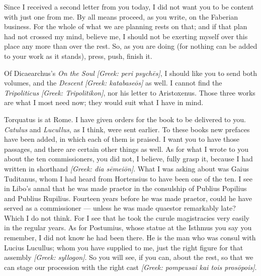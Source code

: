 

 Since I received a second letter from you today, I did not want you to be content with just one from me. By all means proceed, as you write, on the Faberian business. For the whole of what we are planning rests on that; and if that plan had not crossed my mind, believe me, I should not be exerting myself over this place any more than over the rest. So, as you are doing (for nothing can be added to your work as it stands), press, push, finish it.

 Of Dicaearchus's \textit{On the Soul} \textit{[Greek: peri psychēs]}, I should like you to send both volumes, and the \textit{Descent} \textit{[Greek: katabaseōs]} as well. I cannot find the \textit{Tripoliticus} \textit{[Greek: Tripolitikon]}, nor his letter to Aristoxenus. Those three works are what I most need now; they would suit what I have in mind.

 Torquatus is at Rome. I have given orders for the book to be delivered to you. \textit{Catulus} and \textit{Lucullus}, as I think, were sent earlier. To these books new prefaces have been added, in which each of them is praised. I want you to have those passages, and there are certain other things as well. As for what I wrote to you about the ten commissioners, you did not, I believe, fully grasp it, because I had written in shorthand \textit{[Greek: dia sēmeiōn]}. What I was asking about was Gaius Tuditanus, whom I had heard from Hortensius to have been one of the ten. I see in Libo's annal that he was made praetor in the consulship of Publius Popilius and Publius Rupilius. Fourteen years before he was made praetor, could he have served as a commissioner --- unless he was made quaestor remarkably late? Which I do not think. For I see that he took the curule magistracies very easily in the regular years. As for Postumius, whose statue at the Isthmus you say you remember, I did not know he had been there. He is the man who was consul with Lucius Lucullus; whom you have supplied to me, just the right figure for that assembly \textit{[Greek: syllogon]}. So you will see, if you can, about the rest, so that we can stage our procession with the right cast \textit{[Greek: pompeusai kai tois prosōpois]}.
